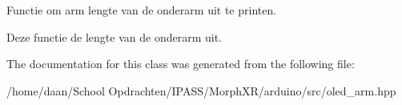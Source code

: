 Functie om arm lengte van de onderarm uit te printen. 

Deze functie de lengte van de onderarm uit. 

The documentation for this class was generated from the following file\+:\begin{DoxyCompactItemize}
\item 
/home/daan/\+School Opdrachten/\+I\+P\+A\+S\+S/\+Morph\+X\+R/arduino/src/oled\+\_\+arm.\+hpp\end{DoxyCompactItemize}
